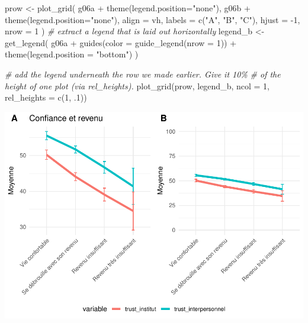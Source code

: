\documentclass[
]{book}
\newenvironment{Shaded}{\begin{snugshade}}{\end{snugshade}}
\newcommand{\AttributeTok}[1]{\textcolor[rgb]{0.77,0.63,0.00}{#1}}
\newcommand{\CommentTok}[1]{\textcolor[rgb]{0.56,0.35,0.01}{\textit{#1}}}
\newcommand{\DecValTok}[1]{\textcolor[rgb]{0.00,0.00,0.81}{#1}}
\newcommand{\FunctionTok}[1]{\textcolor[rgb]{0.00,0.00,0.00}{#1}}
\newcommand{\NormalTok}[1]{#1}
\newcommand{\OtherTok}[1]{\textcolor[rgb]{0.56,0.35,0.01}{#1}}
\newcommand{\SpecialCharTok}[1]{\textcolor[rgb]{0.00,0.00,0.00}{#1}}
\newcommand{\StringTok}[1]{\textcolor[rgb]{0.31,0.60,0.02}{#1}}
\begin{document}
\begin{Shaded}
\begin{Highlighting}[]
\NormalTok{prow }\OtherTok{\textless{}{-}} \FunctionTok{plot\_grid}\NormalTok{(}
\NormalTok{  g06a }\SpecialCharTok{+} \FunctionTok{theme}\NormalTok{(}\AttributeTok{legend.position=}\StringTok{"none"}\NormalTok{),}
\NormalTok{  g06b }\SpecialCharTok{+} \FunctionTok{theme}\NormalTok{(}\AttributeTok{legend.position=}\StringTok{"none"}\NormalTok{),}
  \AttributeTok{align =} \StringTok{\textquotesingle{}vh\textquotesingle{}}\NormalTok{,}
  \AttributeTok{labels =} \FunctionTok{c}\NormalTok{(}\StringTok{"A"}\NormalTok{, }\StringTok{"B"}\NormalTok{, }\StringTok{"C"}\NormalTok{),}
  \AttributeTok{hjust =} \SpecialCharTok{{-}}\DecValTok{1}\NormalTok{,}
  \AttributeTok{nrow =} \DecValTok{1}
\NormalTok{)}
\CommentTok{\# extract a legend that is laid out horizontally}
\NormalTok{legend\_b }\OtherTok{\textless{}{-}} \FunctionTok{get\_legend}\NormalTok{(}
\NormalTok{  g06a }\SpecialCharTok{+} 
    \FunctionTok{guides}\NormalTok{(}\AttributeTok{color =} \FunctionTok{guide\_legend}\NormalTok{(}\AttributeTok{nrow =} \DecValTok{1}\NormalTok{)) }\SpecialCharTok{+}
    \FunctionTok{theme}\NormalTok{(}\AttributeTok{legend.position =} \StringTok{"bottom"}\NormalTok{)}
\NormalTok{)}

\CommentTok{\# add the legend underneath the row we made earlier. Give it 10\%}
\CommentTok{\# of the height of one plot (via rel\_heights).}
\FunctionTok{plot\_grid}\NormalTok{(prow, legend\_b, }\AttributeTok{ncol =} \DecValTok{1}\NormalTok{, }\AttributeTok{rel\_heights =} \FunctionTok{c}\NormalTok{(}\DecValTok{1}\NormalTok{, .}\DecValTok{1}\NormalTok{))}
\end{Highlighting}
\end{Shaded}

\includegraphics{bookdown-demo_files/figure-latex/0422-1.pdf}
\end{document}

